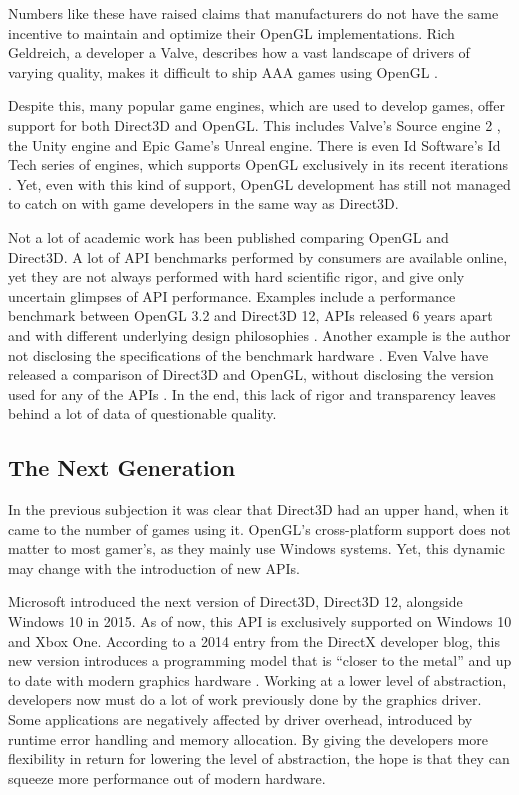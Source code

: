 Numbers like these have raised claims that manufacturers do not have the same incentive to maintain and optimize their OpenGL implementations.
Rich Geldreich, a developer a Valve, describes how a vast landscape of drivers of varying quality, makes it difficult to ship AAA games using OpenGL \cite{openGLDriverQuality}.
 
Despite this, many popular game engines, which are used to develop games, offer support for both Direct3D and OpenGL.
This includes Valve’s Source engine 2 \cite{sourceEngine}, the Unity engine \cite{unityEngine} and Epic Game’s Unreal engine\cite{unrealEngine}.
There is even Id Software’s Id Tech series of engines, which supports OpenGL exclusively in its recent iterations \cite{idTech}.
Yet, even with this kind of support, OpenGL development has still not managed to catch on with game developers in the same way as Direct3D.  

Not a lot of academic work has been published comparing OpenGL and Direct3D.
A lot of \gls{API} benchmarks performed by consumers are available online, yet they are not always performed with hard scientific rigor, and give only uncertain glimpses of \gls{API} performance.
Examples include a performance benchmark between OpenGL 3.2 and Direct3D 12, \glspl{API} released 6 years apart and with different underlying design philosophies \cite{geek3DBenchmark}.
Another example is the author not disclosing the specifications of the benchmark hardware \cite{gTrucBenchmark}.
Even Valve have released a comparison of Direct3D and OpenGL, without disclosing the version used for any of the \glspl{API} \cite{valveBenchmark}.
In the end, this lack of rigor and transparency leaves behind a lot of data of questionable quality.

\subsection{The Next Generation}
In the previous subjection it was clear that Direct3D had an upper hand, when it came to the number of games using it.
OpenGL’s cross-platform support does not matter to most gamer’s, as they mainly use Windows systems.
Yet, this dynamic may change with the introduction of new \glspl{API}.

Microsoft introduced the next version of Direct3D, Direct3D 12, alongside Windows 10 in 2015.
As of now, this \gls{API} is exclusively supported on Windows 10 and Xbox One.
According to a 2014 entry from the DirectX developer blog, this new version introduces a programming model that is “closer to the metal” and up to date with modern graphics hardware \cite{directXBlog}.
Working at a lower level of abstraction, developers now must do a lot of work previously done by the graphics driver.
Some applications are negatively affected by driver overhead, introduced by runtime error handling and memory allocation.
By giving the developers more flexibility in return for lowering the level of abstraction, the hope is that they can squeeze more performance out of modern hardware.
  
